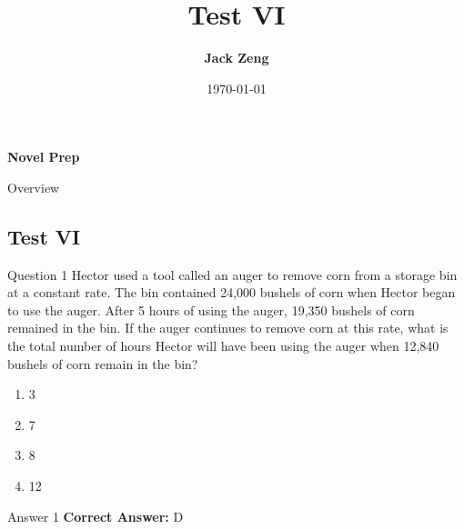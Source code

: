 \documentclass{beamer}
\title[Test VI]{\textbf{Test VI}}
\author{\textbf{Jack Zeng}}
\institute{\textcolor{white}{\textbf{Novel Prep}}}
\date{\today}
\begin{document}
\begin{frame}
    \titlepage
    \vfill
    \begin{flushright}
        \textcolor{purpleblue}{\Huge \textbf{Novel Prep}}
    \end{flushright}
\end{frame}

\begin{frame}
\end{frame}

\begin{frame}{Overview}
    \tableofcontents
\end{frame}

\begin{frame}
\section{Test VI}
\end{frame}

\begin{frame}{Question 1}
\small
Hector used a tool called an auger to remove corn from a storage bin at a constant rate. The bin contained 24,000 bushels of corn when Hector began to use the auger. After 5 hours of using the auger, 19,350 bushels of corn remained in the bin. If the auger continues to remove corn at this rate, what is the total number of hours Hector will have been using the auger when 12,840 bushels of corn remain in the bin?
\vspace{0.35cm}
\begin{enumerate}
    \item[A.] 3
    \item[B.] 7
    \item[C.] 8
    \item[D.] 12
\end{enumerate}
\end{frame}
\begin{frame}{Answer 1}
\small
\textbf{Correct Answer:} D
\end{frame}
\end{document}
